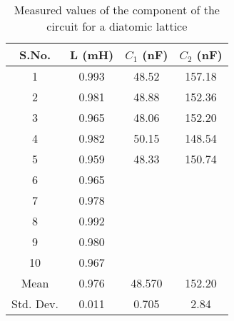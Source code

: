 \begin{table}[]
    \centering
    \begin{tabular}{|c|c|c|c|}
    \hline
    S.No. & L (mH) & $C_1$ (nF) & $C_2$ (nF) \\ \hline
    1 & 0.993 & 48.52 & 157.18 \\ 
    2 & 0.981 & 48.88 & 152.36 \\ 
    3 & 0.965 & 48.06 & 152.20 \\ 
    4 & 0.982 & 50.15 & 148.54 \\ 
    5 & 0.959 & 48.33 & 150.74 \\ 
    6 & 0.965 &  &  \\ 
    7 & 0.978 &  &  \\ 
    8 & 0.992 &  &  \\ 
    9 & 0.980 &  &  \\ 
    10 & 0.967 &  &  \\ \hline
    Mean & 0.976 & 48.570 & 152.20 \\ \hline
    Std. Dev. & 0.011 & 0.705 & 2.84 \\ \hline
    \end{tabular}
    \caption{Measured values of the component of the circuit for a diatomic lattice}
    \label{tab:di}
\end{table}